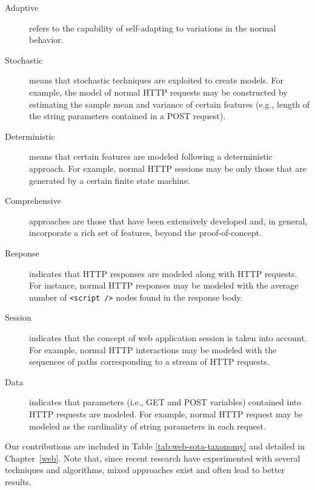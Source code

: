 \begin{description}
\item[Adaptive] refers to the capability of self-adapting to
variations in the normal behavior.
\item[Stochastic] means that stochastic techniques are exploited to
create models. For example, the model of normal \ac{HTTP}
requests may be constructed by estimating the sample mean and variance
of certain features (e.g., length of the string parameters contained
in a POST request).
\item[Deterministic] means that certain features are modeled following
a deterministic approach. For example, normal \ac{HTTP}
sessions may be only those that are generated by a certain finite
state machine.
\item[Comprehensive] approaches are those that have been extensively
developed and, in general, incorporate a rich set of features, beyond
the proof-of-concept.
\item[Response] indicates that \ac{HTTP} responses are
modeled along with \ac{HTTP} requests. For instance,
normal \ac{HTTP} responses may be modeled with the average
number of \texttt{<script />} nodes found in the response body.
\item[Session] indicates that the concept of web application session
is taken into account. For example, normal \ac{HTTP}
interactions may be modeled with the sequences of paths corresponding
to a stream of \ac{HTTP} requests.
\item[Data] indicates that parameters (i.e., GET and POST variables)
contained into \ac{HTTP} requests are modeled. For
example, normal \ac{HTTP} request may be modeled as the
cardinality of string parameters in each request.
\end{description}

Our contributions are included in Table \ref{tab:web-sota-taxonomy}
and detailed in Chapter~\ref{web}. Note that, since recent research
have experimented with several techniques and algorithms, mixed
approaches exist and often lead to better results.

